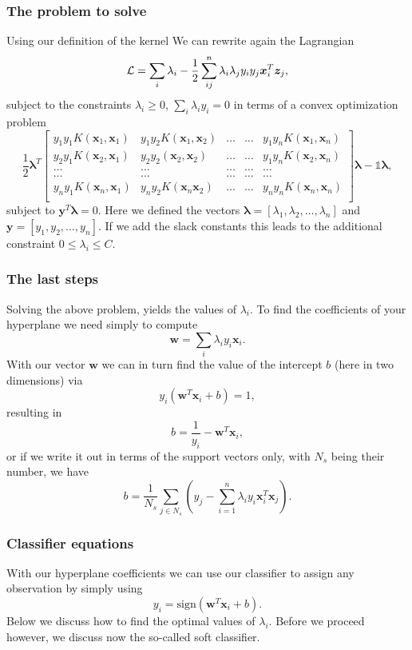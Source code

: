 \documentclass{beamer}
\begin{document}
\begin{frame}
\frametitle{The problem to solve}

Using our definition of the kernel We can rewrite again the Lagrangian
\[
{\cal L}=\sum_i\lambda_i-\frac{1}{2}\sum_{ij}^n\lambda_i\lambda_jy_iy_j\bm{x}_i^T\bm{z}_j,
\]
subject to the constraints $\lambda_i\geq 0$, $\sum_i\lambda_iy_i=0$ in terms of a convex optimization problem
\[
\frac{1}{2} \bm{\lambda}^T\begin{bmatrix} y_1y_1K(\bm{x}_1,\bm{x}_1) & y_1y_2K(\bm{x}_1,\bm{x}_2) & \dots & \dots & y_1y_nK(\bm{x}_1,\bm{x}_n) \\
y_2y_1K(\bm{x}_2,\bm{x}_1) & y_2y_2(\bm{x}_2,\bm{x}_2) & \dots & \dots & y_1y_nK(\bm{x}_2,\bm{x}_n) \\
\dots & \dots & \dots & \dots & \dots \\
\dots & \dots & \dots & \dots & \dots \\
y_ny_1K(\bm{x}_n,\bm{x}_1) & y_ny_2K(\bm{x}_n\bm{x}_2) & \dots & \dots & y_ny_nK(\bm{x}_n,\bm{x}_n) \\
\end{bmatrix}\bm{\lambda}-\mathbb{1}\bm{\lambda}, 
\]
subject to $\bm{y}^T\bm{\lambda}=0$. Here we defined the vectors $\bm{\lambda} =[\lambda_1,\lambda_2,\dots,\lambda_n]$ and 
$\bm{y}=[y_1,y_2,\dots,y_n]$. 
If we add the slack constants this leads to the additional constraint $0\leq \lambda_i \leq C$.
\end{frame}

\begin{frame}
\frametitle{The last steps}

Solving the above problem, yields the values of $\lambda_i$.
To find the coefficients of your hyperplane we need simply to compute 
\[
\bm{w}=\sum_{i} \lambda_iy_i\bm{x}_i.
\]
With our vector $\bm{w}$ we can in turn find the value of the intercept $b$ (here in two dimensions) via 
\[
y_i(\bm{w}^T\bm{x}_i+b)=1,
\]
resulting in
\[
b = \frac{1}{y_i}-\bm{w}^T\bm{x}_i,
\]
or if we write it out in terms of the support vectors only, with $N_s$ being their number,  we have
\[
b = \frac{1}{N_s}\sum_{j\in N_s}\left(y_j-\sum_{i=1}^n\lambda_iy_i\bm{x}_i^T\bm{x}_j\right).
\]
\end{frame}

\begin{frame}
\frametitle{Classifier equations}

With our hyperplane coefficients we can use our classifier to assign any observation by simply using 
\[
y_i = \mathrm{sign}(\bm{w}^T\bm{x}_i+b).
\]
Below we discuss how to find the optimal values of $\lambda_i$. Before we proceed however, we discuss now the so-called soft classifier.
\end{frame}
\end{document}
